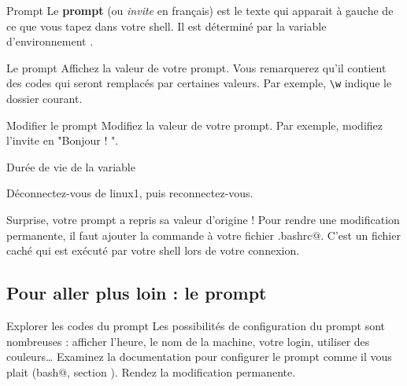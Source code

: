 \documentclass[a4paper,11pt]{style-esi/td}
\begin{document}
		\begin{theorie}{Prompt}
			Le \textbf{prompt} (ou \textit{invite} en français) 
			est le texte qui apparait à gauche
			de ce que vous tapez dans votre shell. 
			Il est déterminé par la variable d'environnement .
		\end{theorie}
			
		\begin{Experience}{Le prompt} 
			Affichez la valeur de votre prompt. 
			Vous remarquerez qu'il contient des codes qui seront 
			remplacés par certaines valeurs. 
			Par exemple, \verb_\w_ indique le dossier courant.
		\end{Experience}
			
		\begin{Exercice}{Modifier le prompt} 
			Modifiez la valeur de votre prompt.
			Par exemple, modifiez l'invite en "Bonjour ! ".
		\end{Exercice}	

		\begin{Tutoriel}{Durée de vie de la variable} 
			\vspace{-1em}
			\begin{steps}
			\item Déconnectez-vous de linux1, puis reconnectez-vous.	
			\end{steps}
			Surprise, votre prompt a repris sa valeur d'origine ! 
			Pour rendre une modification permanente, 
			il faut ajouter la commande à votre fichier \verb@.bashrc@.
			C'est un fichier caché qui est exécuté 
			par votre shell lors de votre connexion.
        \end{Tutoriel}

        \subsection{Pour aller plus loin : le prompt}
    
            \begin{Exercice}{Explorer les codes du prompt}
                Les possibilités de configuration du prompt sont nombreuses : 
                afficher l'heure, le nom de la machine, votre login,
                utiliser des couleurs\dots{}
                Examinez la documentation pour configurer le prompt comme il 
                vous plait (\verb@man bash@, section \verb@PROMPTING@).
                Rendez la modification permanente.
            \end{Exercice}	
            
\end{document}
